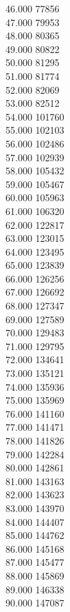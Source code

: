 { 46.000	77856 \\
 47.000	79953 \\
 48.000	80365 \\
 49.000	80822 \\
 50.000	81295 \\
 51.000	81774 \\
 52.000	82069 \\
 53.000	82512 \\
 54.000	101760 \\
 55.000	102103 \\
 56.000	102486 \\
 57.000	102939 \\
 58.000	105432 \\
 59.000	105467 \\
 60.000	105963 \\
 61.000	106320 \\
 62.000	122817 \\
 63.000	123015 \\
 64.000	123495 \\
 65.000	123839 \\
 66.000	126256 \\
 67.000	126692 \\
 68.000	127347 \\
 69.000	127589 \\
 70.000	129483 \\
 71.000	129795 \\
 72.000	134641 \\
 73.000	135121 \\
 74.000	135936 \\
 75.000	135969 \\
 76.000	141160 \\
 77.000	141471 \\
 78.000	141826 \\
 79.000	142284 \\
 80.000	142861 \\
 81.000	143163 \\
 82.000	143623 \\
 83.000	143970 \\
 84.000	144407 \\
 85.000	144762 \\
 86.000	145168 \\
 87.000	145477 \\
 88.000	145869 \\
 89.000	146338 \\
 90.000	147087 \\
}
